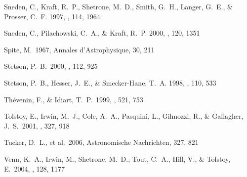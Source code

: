 \documentclass{emulateapj}
\begin{document}
\begin{thebibliography}{}
 Sneden, C., Kraft, R.~P.,
  Shetrone, M.~D., Smith, G.~H., Langer, G.~E., \& Prosser,
  C.~F. 1997, \aj, 114, 1964

  Sneden, C., Pilachowski, C.~A., \& Kraft, R.~P. 2000, \aj, 120, 1351

 Spite, M.\ 1967, Annales d'Astrophysique,
  30, 211

 Stetson, P.~B.\ 2000, \pasp, 112, 925

 Stetson, P.~B., Hesser, J.~E.,
  \& Smecker-Hane, T.~A. 1998, \pasp, 110, 533


 Th{\'e}venin, F., \&
  Idiart, T.~P.\ 1999, \apj, 521, 753


 Tolstoy, E., Irwin, M.~J., Cole,
  A.~A., Pasquini, L., Gilmozzi, R., \& Gallagher, J.~S.\ 2001,
  \mnras, 327, 918



 Tucker, D.~L., et al.\ 2006,
  Astronomische Nachrichten, 327, 821





 Venn, K.~A., Irwin, M., Shetrone,
  M.~D., Tout, C.~A., Hill, V., \& Tolstoy, E.\ 2004, \aj, 128, 1177


\end{thebibliography}
\end{document}
